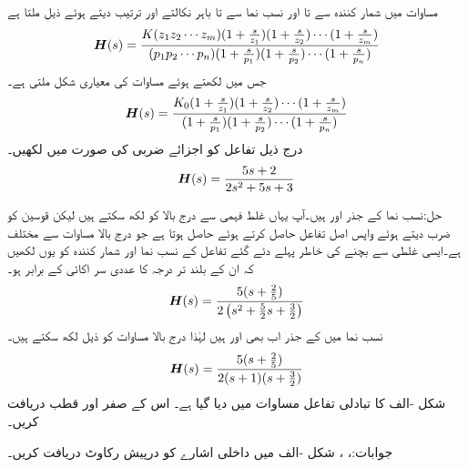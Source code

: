 مساوات  میں  شمار کنندہ سے  تا  اور نسب نما سے  تا  باہر نکالتے اور ترتیب دیتے ہوئے ذیل ملتا ہے
\begin{align*}
{\ensuremath{{\boldsymbol{H}}}}(s)=\frac{K(z_1 z_2 \cdots z_m) (1+\frac{s}{z_1})(1+\frac{s}{z_2})\cdots (1+\frac{s}{z_m})}{(p_1 p_2 \cdots p_n)(1+\frac{s}{p_1})(1+\frac{s}{p_2}) \cdots (1+\frac{s}{p_n})}
\end{align*}
جس میں  لکھتے ہوئے مساوات کی معیاری شکل ملتی ہے۔
\begin{align}\label{مساوات_تعددی_تبادلی_تفاعل_معیاری_صورت}
{\ensuremath{{\boldsymbol{H}}}}(s)=\frac{K_0 (1+\frac{s}{z_1})(1+\frac{s}{z_2})\cdots (1+\frac{s}{z_m})}{(1+\frac{s}{p_1})(1+\frac{s}{p_2}) \cdots (1+\frac{s}{p_n})}
\end{align}
درج ذیل تفاعل کو اجزائے ضربی کی صورت میں لکھیں۔
\begin{align*}
{\ensuremath{{\boldsymbol{H}}}}(s)=\frac{5s+2}{2s^2+5s+3}
\end{align*}

حل:نسب نما  کے جذر  اور  ہیں۔آپ یہاں غلط فہمی سے درج بالا کو  لکھ سکتے ہیں لیکن قوسین کو ضرب دیتے ہوئے واپس اصل تفاعل حاصل کرتے ہوئے  حاصل ہوتا ہے جو درج بالا مساوات سے مختلف ہے۔ایسی غلطی سے بچنے کی خاطر پہلے دئے گئے تفاعل کے نسب نما اور شمار کنندہ کو یوں لکھیں کہ  ان کے بلند تر درجہ  کا عددی سر اکائی کے برابر ہو۔ 
\begin{align*}
{\ensuremath{{\boldsymbol{H}}}}(s)=\frac{5(s+\frac{2}{5})}{2\left(s^2+\frac{5}{2}s+\frac{3}{2}\right)}
\end{align*}
نسب نما میں  کے جذر اب بھی  اور  ہیں لہٰذا درج بالا مساوات کو ذیل لکھ سکتے ہیں۔
\begin{align*}
{\ensuremath{{\boldsymbol{H}}}}(s)=\frac{5(s+\frac{2}{5})}{2(s+1)(s+\frac{3}{2})}
\end{align*}
شکل -الف کا تبادلی تفاعل مساوات  میں دیا گیا ہے۔ اس کے صفر اور قطب دریافت کریں۔

جوابات:، ، 
شکل -الف میں داخلی اشارے کو درپیش رکاوٹ دریافت کریں۔

